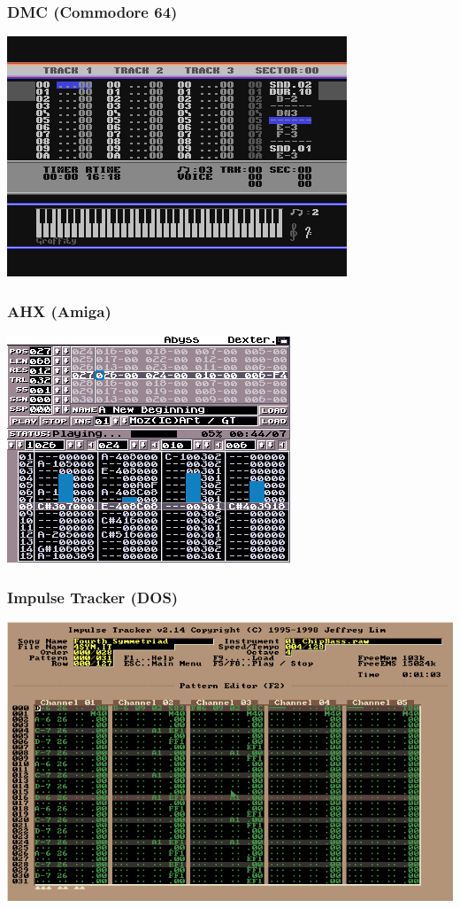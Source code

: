 \documentclass{beamer}
\begin{document}
\begin{frame}
\frametitle{DMC (Commodore 64)}
\begin{center}
\includegraphics[scale=0.5]{dmc}
\end{center}
\end{frame}

\begin{frame}
\frametitle{AHX (Amiga)}
\begin{center}
\includegraphics[scale=0.6]{ahx}
\end{center}
\end{frame}

\begin{frame}
\frametitle{Impulse Tracker (DOS)}
\begin{center}
\includegraphics[scale=0.4]{impulsetracker}
\end{center}
\end{frame}
\end{document}
